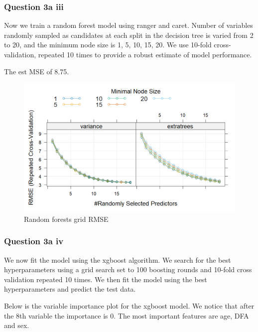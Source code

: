 \documentclass[
]{article}
\begin{document}
\hypertarget{question-3a-iii}{%
\subsubsection{Question 3a iii}\label{question-3a-iii}}

Now we train a random forest model using ranger and caret. Number of
variables randomly sampled as candidates at each split in the decision
tree is varied from 2 to 20, and the minimum node size is 1, 5, 10, 15,
20. We use 10-fold cross-validation, repeated 10 times to provide a
robust estimate of model performance.

The est MSE of 8.75.

\begin{figure}
\centering
\includegraphics[width=6.22917in,height=\textheight]{rmse_random_forest.png}
\caption{Random forests grid RMSE}
\end{figure}

\hypertarget{question-3a-iv}{%
\subsubsection{Question 3a iv}\label{question-3a-iv}}

We now fit the model using the xgboost algorithm. We search for the best
hyperparameters using a grid search set to 100 boosting rounds and
10-fold cross validation repeated 10 times. We then fit the model using
the best hyperparameters and predict the test data.

Below is the variable importance plot for the xgboost model. We notice
that after the 8th variable the importance is 0. The most important
features are age, DFA and sex.
\end{document}
